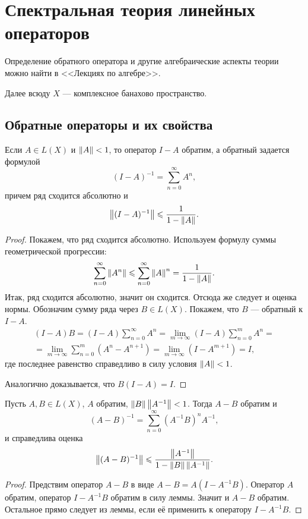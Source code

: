 \section{Спектральная теория линейных операторов}
Определение обратного оператора и другие алгебраические аспекты теории можно найти
в <<Лекциях по алгебре>>.

Далее всюду $X$ --- комплексное банахово пространство.
\subsection{Обратные операторы и их свойства}
\begin{lemma}
    Если $A \in L(X)$ и $\left\|A\right\| < 1$, то оператор $I - A$ обратим, а обратный задается формулой
    \[ (I - A)^{-1} = \sum_{n = 0}^\infty A^n, \]
    причем ряд сходится абсолютно и
    \[ \left\|(I-A)^{-1}\right\| \leqslant \frac{1}{1-\left\|A\right\|}. \]
\end{lemma}

\begin{proof}
    Покажем, что ряд сходится абсолютно. Используем формулу суммы геометрической прогрессии:
    \[ \sum_{n=0}^\infty \left\|A^n\right\| \leqslant \sum_{n=0}^\infty \left\|A\right\|^n = \frac{1}{1-\left\|A\right\|}. \]
    Итак, ряд сходится абсолютно, значит он сходится. Отсюда же следует и оценка нормы.
    Обозначим сумму ряда через $B \in L(X)$. Покажем, что $B$ --- обратный к $I - A$.
    \begin{multline*}
        (I - A)B = (I - A)\sum_{n=0}^\infty A^n = \lim_{m\to \infty} (I - A)\sum_{n=0}^m A^n = \\
            = \lim_{m \to \infty} \sum_{n=0}^m (A^n - A^{n+1}) = \lim_{m\to \infty} (I - A^{m+1})
            = I,
    \end{multline*}
    где последнее равенство справедливо в силу условия $\left\|A\right\| < 1$.

    Аналогично доказывается, что $B(I - A) = I$.
\end{proof}

\begin{theorem}
    Пусть $A, B \in L(X)$, $A$ обратим, $\left\|B\right\|\left\|A^{-1}\right\| < 1$. Тогда $A - B$ обратим и
    \[ (A-B)^{-1} = \sum_{n=0}^\infty (A^{-1}B)^n A^{-1}, \]
    и справедлива оценка
    \[ \left\|(A-B)^{-1}\right\| \leqslant \frac{\left\|A^{-1}\right\|}{1-\left\|B\right\|\left\|A^{-1}\right\|}. \]
\end{theorem}

\begin{proof}
    Предствим оператор $A-B$ в виде $A - B = A(I-A^{-1}B)$. Оператор $A$ обратим, оператор
    $I-A^{-1}B$ обратим в силу леммы. Значит и $A - B$ обратим. Остальное прямо следует из леммы,
    если её применить к оператору $I-A^{-1}B$.
\end{proof}

